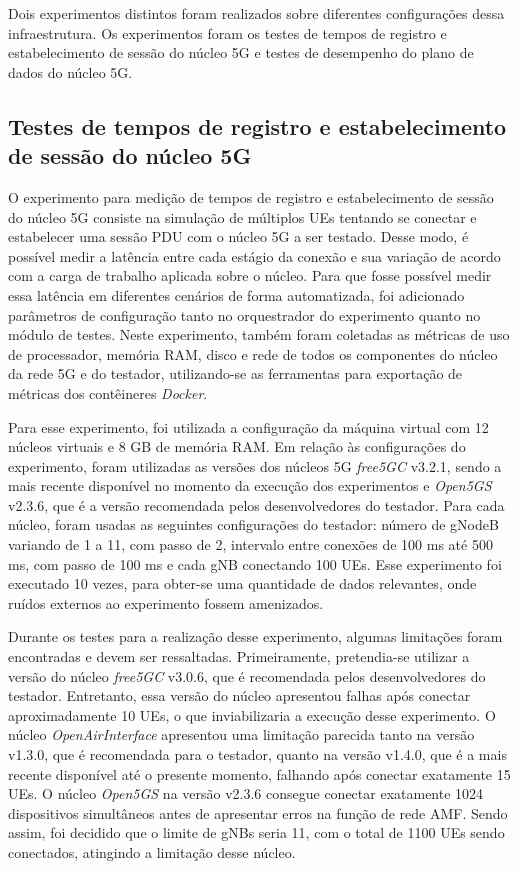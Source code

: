 Dois experimentos distintos foram realizados sobre diferentes configurações dessa infraestrutura.
Os experimentos foram os testes de tempos de registro e estabelecimento de sessão do núcleo 5G e testes de desempenho do plano de dados do núcleo 5G.

\subsection{Testes de tempos de registro e estabelecimento de sessão do núcleo 5G}

O experimento para medição de tempos de registro e estabelecimento de sessão do núcleo 5G consiste na simulação de múltiplos UEs tentando se conectar e estabelecer uma sessão PDU com o núcleo 5G a ser testado.
Desse modo, é possível medir a latência entre cada estágio da conexão e sua variação de acordo com a carga de trabalho aplicada sobre o núcleo.
Para que fosse possível medir essa latência em diferentes cenários de forma automatizada, foi adicionado parâmetros de configuração tanto no orquestrador do experimento quanto no módulo de testes.
Neste experimento, também foram coletadas as métricas de uso de processador, memória RAM, disco e rede de todos os componentes do núcleo da rede 5G e do testador, utilizando-se as ferramentas para exportação de métricas dos contêineres \textit{Docker}.

Para esse experimento, foi utilizada a configuração da máquina virtual com 12 núcleos virtuais e 8 GB de memória RAM.
Em relação às configurações do experimento, foram utilizadas as versões dos núcleos 5G \textit{free5GC} v3.2.1, sendo a mais recente disponível no momento da execução dos experimentos e \textit{Open5GS} v2.3.6, que é a versão recomendada pelos desenvolvedores do testador.
Para cada núcleo, foram usadas as seguintes configurações do testador: número de gNodeB variando de 1 a 11, com passo de 2, intervalo entre conexões de 100 ms até 500 ms, com passo de 100 ms e cada gNB conectando 100 UEs.
Esse experimento foi executado 10 vezes, para obter-se uma quantidade de dados relevantes, onde ruídos externos ao experimento fossem amenizados.

Durante os testes para a realização desse experimento, algumas limitações foram encontradas e devem ser ressaltadas.
Primeiramente, pretendia-se utilizar a versão do núcleo \textit{free5GC} v3.0.6, que é recomendada pelos desenvolvedores do testador. Entretanto, essa versão do núcleo apresentou falhas após conectar aproximadamente 10 UEs, o que inviabilizaria a execução desse experimento.
O núcleo \textit{OpenAirInterface} apresentou uma limitação parecida tanto na versão v1.3.0, que é recomendada para o testador, quanto na versão v1.4.0, que é a mais recente disponível até o presente momento, falhando após conectar exatamente 15 UEs.
O núcleo \textit{Open5GS} na versão v2.3.6 consegue conectar exatamente 1024 dispositivos simultâneos antes de apresentar erros na função de rede AMF. Sendo assim, foi decidido que o limite de gNBs seria 11, com o total de 1100 UEs sendo conectados, atingindo a limitação desse núcleo.


